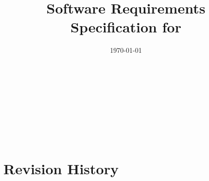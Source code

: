 \documentclass[12pt]{article}
\begin{document}
\title{Software Requirements Specification for \progname} 
\author{\authname}
\date{\today}
	
\maketitle

~\newpage


\tableofcontents

~\newpage

\listoftables

~\newpage

\listoffigures

~\newpage

\section*{Revision History}
\end{document}
